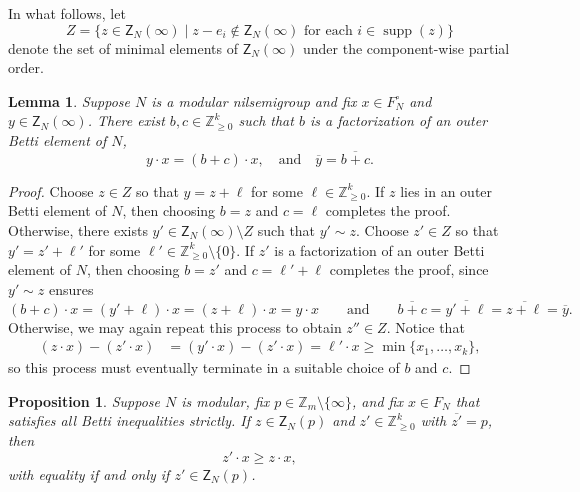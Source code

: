 \documentclass[10pt,a4paper]{amsart}
\newcommand\ZZ{\mathbb{Z}}
\DeclareMathOperator\supp{supp}
\newtheorem{prop}[thm]{Proposition}
\newtheorem{lemma}[thm]{Lemma}
\theoremstyle{definition}\newtheorem{defi}[thm]{Definition}
\begin{document}
\setcounter{thm}{4}
In what follows, let
$$Z = \{z \in \mathsf{Z}_N(\infty) \mid z - e_i \notin \mathsf{Z}_N(\infty) \text{ for each } i \in \supp(z)\}$$
denote the set of minimal elements of $\mathsf Z_N(\infty)$ under the component-wise partial order.  

\begin{lemma}\label{l:locateouterbetti}
Suppose $N$ is a modular nilsemigroup and fix $x \in F_N^\circ$ and $y \in \mathsf{Z}_N(\infty)$.  There exist $b, c \in \ZZ_{\geq 0}^k$ such that $b$ is a factorization of an outer Betti element of $N$,
\[
y \cdot x = (b+c) \cdot x, \quad \text{and} \quad \overline{y} = \overline{b+c}.
\]
\end{lemma}

\begin{proof}
Choose $z \in Z$ so that $y = z + \ell$ for some $\ell \in \ZZ_{\geq 0}^k$.  If $z$ lies in an outer Betti element of $N$, then choosing $b = z$ and $c = \ell$ completes the proof.  Otherwise, there exists $y' \in \mathsf Z_N(\infty) \setminus Z$ such that $y' \sim z$.  Choose $z' \in Z$ so that $y' = z' + \ell'$ for some $\ell' \in \ZZ_{\geq 0}^k \setminus \{0\}$.  If $z'$ is a factorization of an outer Betti element of $N$, then choosing $b = z'$ and $c = \ell' + \ell$ completes the proof, since $y' \sim z$ ensures
$$
(b + c) \cdot x = (y' + \ell) \cdot x = (z + \ell) \cdot x = y \cdot x
\qquad \text{and} \qquad
\overline{b + c} = \overline{y' + \ell} = \overline{z + \ell} = \overline{y}.
$$
Otherwise, we may again repeat this process to obtain $z'' \in Z$.  Notice that 
\begin{align*}
(z \cdot x) - (z' \cdot x)
&= (y' \cdot x) - (z' \cdot x)
= \ell' \cdot x
\ge \min \{x_1, \ldots, x_k\},
\end{align*}
so this process must eventually terminate in a suitable choice of $b$ and $c$.  
\end{proof}

\begin{prop}\label{p:innerfactsminimal}
Suppose $N$ is modular, fix $p \in \ZZ_m \setminus \{\infty\}$, and fix $x \in F_N$ that satisfies all Betti inequalities strictly.  If $z \in \mathsf Z_N(p)$ and $z' \in \ZZ_{\ge 0}^k$ with $\overline{z'} = p$, then
\[
z'\cdot x \geq z \cdot x,
\]
with equality if and only if $z' \in \mathsf{Z}_{N}(p)$.  
\end{prop}
\end{document}
